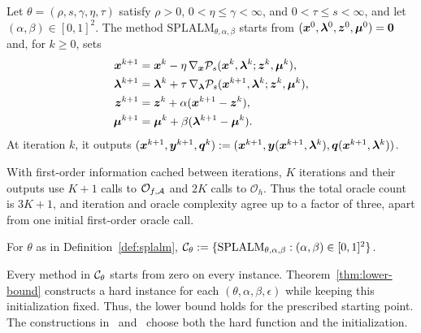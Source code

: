 \begin{definition}[SPLALM]
\label{def:splalm}
Let \(\theta=(\rho,s,\gamma,\eta,\tau)\) satisfy \(\rho>0\),
\(0<\eta\le\gamma<\infty\), and \(0<\tau\le s<\infty\), and let
\((\alpha,\beta)\in[0,1]^2\). The method \(\mathrm{SPLALM}_{\theta,\alpha,\beta}\)
starts from \((\bm{x}^0,\bm{\lambda}^0,\bm{z}^0,\bm{\mu}^0)=\bm{0}\) and, for \(k\ge0\), sets
\begin{equation}
\begin{aligned}
    \bm{x}^{k+1}&=\bm{x}^k-\eta\,\nabla_{\bm{x}}\mathcal P_s(\bm{x}^k,\bm{\lambda}^k;\bm{z}^k,\bm{\mu}^k),\\
    \bm{\lambda}^{k+1}&=\bm{\lambda}^k+\tau\,\nabla_{\bm{\lambda}}\mathcal P_s(\bm{x}^{k+1},\bm{\lambda}^k;\bm{z}^k,\bm{\mu}^k),\\
    \bm{z}^{k+1}&=\bm{z}^k+\alpha(\bm{x}^{k+1}-\bm{z}^k),\\
    \bm{\mu}^{k+1}&=\bm{\mu}^k+\beta(\bm{\lambda}^{k+1}-\bm{\mu}^k).
\end{aligned}
    \label{eq:splalm-updates}
\end{equation}
At iteration \(k\), it outputs
\((\bm{x}^{k+1},\bm{y}^{k+1},\bm{q}^k)
:=(\bm{x}^{k+1},\bm{y}(\bm{x}^{k+1},\bm{\lambda}^k),\bm{q}(\bm{x}^{k+1},\bm{\lambda}^k))\).
\end{definition}

With first-order information cached between iterations, \(K\) iterations and
their outputs use \(K+1\) calls to \(\mathcal O_{f,\mathcal{A}}\) and \(2K\) calls to
\(\mathcal O_h\). Thus the total oracle count is \(3K+1\), and iteration
and oracle complexity agree up to a factor of three, apart from one initial
first-order oracle call.

\begin{definition}
\label{def:algorithm-family}
For \(\theta\) as in Definition~\ref{def:splalm},
\(\mathcal{C}_\theta:=\{\mathrm{SPLALM}_{\theta,\alpha,\beta}:(\alpha,\beta)\in[0,1]^2\}\).
\end{definition}

\begin{remark}[Initialization]
\label{rem:lb-initialization}
Every method in \(\mathcal{C}_\theta\) starts from zero on every instance.
Theorem~\ref{thm:lower-bound} constructs a hard instance for each
\((\theta,\alpha,\beta,\epsilon)\) while keeping this initialization fixed.
Thus, the lower bound holds for the prescribed starting point.
The constructions in~\cite[Section~5.1.1]{li2026smoothing}
and~\cite[Appendix~C.1]{mahdavinia2022tight} choose both the hard function
and the initialization.
\end{remark}

